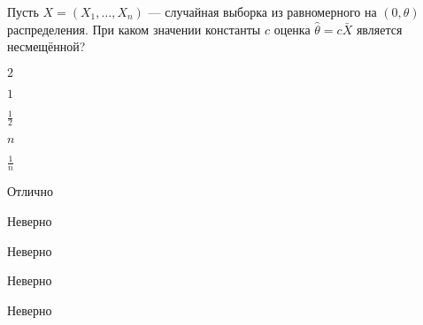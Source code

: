 
\begin{question}
Пусть \(X = (X_1, \ldots , X_n)\) --- случайная выборка из равномерного
на \((0, \theta)\) распределения. При каком значении константы \(c\)
оценка \(\hat{\theta} = c \bar{X}\) является несмещённой?
\begin{answerlist}
  \item \(2\)
  \item \(1\)
  \item \(\frac{1}{2}\)
  \item \(n\)
  \item \(\frac{1}{n}\)
\end{answerlist}
\end{question}

\begin{solution}
\begin{answerlist}
  \item Отлично
  \item Неверно
  \item Неверно
  \item Неверно
  \item Неверно
\end{answerlist}
\end{solution}

